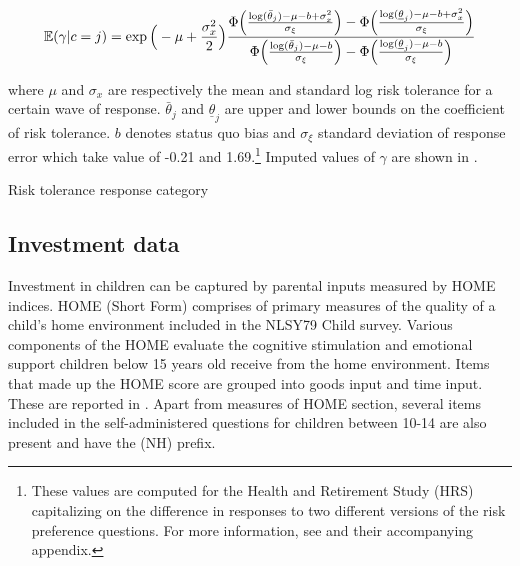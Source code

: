 \documentclass[]{article}
\begin{document}
\begin{equation}
	\mathbb E(\gamma|c=j)=\exp\Big(-\mu+{\sigma_x^2\over 2}\Big){\Phi\Big({\log(\bar{\theta}_j)-\mu-b+\sigma_x^2\over \sigma_{\xi}}\Big)-\Phi\Big({\log(\underline{\theta}_j)-\mu-b+\sigma_x^2\over \sigma_{\xi}}\Big)\over \Phi\Big({\log(\bar{\theta}_j)-\mu-b\over \sigma_\xi}\Big)-\Phi\Big({\log(\underline{\theta}_j)-\mu-b\over \sigma_\xi}\Big)}
	\label{eq:1-conditional-expectation}
\end{equation}

where $\mu$ and $\sigma_x$ are respectively the mean and standard log risk tolerance for a certain wave of response. $\bar \theta_j$ and $\underline{\theta}_j$ are upper and lower bounds on the coefficient of risk tolerance. $b$ denotes status quo bias and $\sigma_\xi$ standard deviation of response error which take value of -0.21 and 1.69.\footnote{These values are computed for the Health and Retirement Study (HRS) capitalizing on the difference in responses to two different versions of the risk preference questions. For more information, see \citet{kimball2009risk} and their accompanying appendix.} Imputed values of $\gamma$ are shown in .

\begin{table}[!h]
	\centering
	\setlength{\extrarowheight}{0.3em}
	\caption{Risk tolerance response category}	
	
	\label{table:2-risk-bound}
\end{table}

\begin{comment}
	\begin{table}[!h]
		\centering
		\setlength{\extrarowheight}{0.3em}
		\caption{Imputed coefficient of risk aversion}	
		
		\label{table:3-imputed-risk}
	\end{table}
	content...
\end{comment}




\subsection{Investment data}
Investment in children can be captured by parental inputs measured by HOME indices. HOME (Short Form) comprises of primary measures of the quality of a child's home environment included in the NLSY79 Child survey. Various components of the HOME evaluate the cognitive stimulation and emotional support children below 15 years old receive from the home environment. Items that made up the HOME score are grouped into goods input and time input. These are reported in . Apart from measures of HOME section, several items included in the self-administered questions for children between 10-14 are also present and have the (NH) prefix.  
\end{document}
